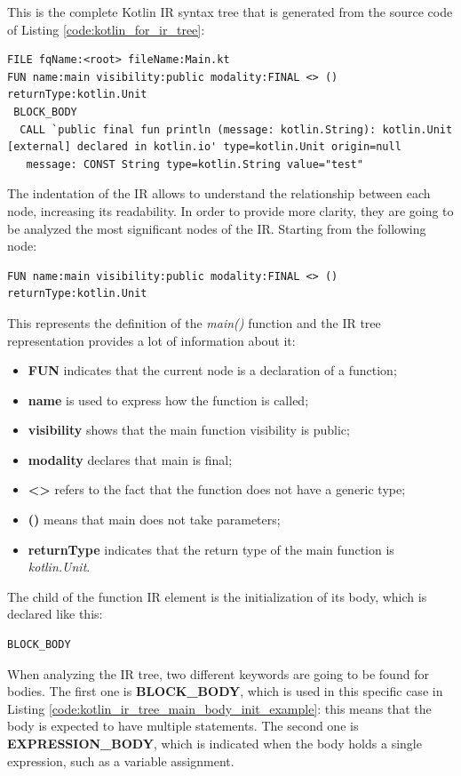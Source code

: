 This is the complete Kotlin IR syntax tree that is generated from the source code of Listing \ref{code:kotlin_for_ir_tree}:
\begin{lstlisting}[caption={Kotlin IR tree of Listing \ref{code:kotlin_for_ir_tree}}, captionpos=b, basicstyle=\small, label={code:kotlin_ir_tree_example}]
FILE fqName:<root> fileName:Main.kt
FUN name:main visibility:public modality:FINAL <> () returnType:kotlin.Unit
 BLOCK_BODY
  CALL `public final fun println (message: kotlin.String): kotlin.Unit [external] declared in kotlin.io' type=kotlin.Unit origin=null
   message: CONST String type=kotlin.String value="test"
\end{lstlisting}
The indentation of the IR allows to understand the relationship between each node, increasing its readability. In order to provide more clarity, they are going to be analyzed the most significant nodes of the IR.\newline
Starting from the following node:
\begin{lstlisting}[caption={Kotlin IR tree of the main function in Listing \ref{code:kotlin_for_ir_tree}}, captionpos=b, label={code:kotlin_ir_tree_main_example}]
FUN name:main visibility:public modality:FINAL <> () returnType:kotlin.Unit
\end{lstlisting}
This represents the definition of the \textit{main()} function and the IR tree representation provides a lot of information about it:
\begin{itemize}
    \item \textbf{FUN} indicates that the current node is a declaration of a function;
    \item \textbf{name} is used to express how the function is called;
    \item \textbf{visibility} shows that the main function visibility is public;
    \item \textbf{modality} declares that main is final;
    \item \textbf{<>} refers to the fact that the function does not have a generic type;
    \item \textbf{()} means that main does not take parameters;
    \item \textbf{returnType} indicates that the return type of the main function is \textit{kotlin.Unit}.
\end{itemize}

The child of the function IR element is the initialization of its body, which is declared like this:
\begin{lstlisting}[caption={Kotlin IR tree of the body block of the main function in Listing \ref{code:kotlin_for_ir_tree}}, captionpos=b, label={code:kotlin_ir_tree_main_body_init_example}]
BLOCK_BODY
\end{lstlisting}
When analyzing the IR tree, two different keywords are going to be found for bodies. The first one is \textbf{BLOCK\_BODY}, which is used in this specific case in Listing \ref{code:kotlin_ir_tree_main_body_init_example}: this means that the body is expected to have multiple statements. The second one is \textbf{EXPRESSION\_BODY}, which is indicated when the body holds a single expression, such as a variable assignment.

